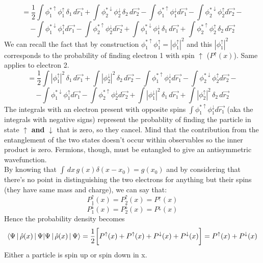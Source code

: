 \[
=\frac{1}{2}\int \phi_1^{*\uparrow}\phi_1^\uparrow \,\delta_1\, d\vec{r_1}
+\int \phi_2^{*\downarrow}\phi_2^\downarrow\, \delta_2\, d\vec{r_2}
-\int \phi_1^{*\uparrow}\phi_1^\downarrow d\vec{r_1}
-\int \phi_2^{*\downarrow}\phi_2^\uparrow d\vec{r_2}-\]
\[
-\int \phi_1^{*\downarrow}\phi_1^\uparrow d\vec{r_1}
-\int \phi_2^{*\uparrow}\phi_2^\downarrow d\vec{r_2}
+\int \phi_1^{*\downarrow}\phi_1^\downarrow\, \delta_1\, d\vec{r_1}
+\int \phi_2^{*\uparrow}\phi_2^\uparrow\, \delta_2\, d\vec{r_2}
\]
We can recall the fact that by construction $\phi_1^{*\uparrow}\phi_1^\uparrow=|\phi_1^\uparrow|^2$  and this $|\phi_1^\uparrow|^2$ corresponds to the probability of finding electron 1 with spin $\uparrow$ ($P^\uparrow(x)$). Same applies to electron 2.\\
\[
=\frac{1}{2}\int |\phi_1^\uparrow|^2 \,\delta_1\, d\vec{r_1}
+\int |\phi_2^\downarrow|^2\, \delta_2\, d\vec{r_2}
-\int \phi_1^{*\uparrow}\phi_1^\downarrow d\vec{r_1}
-\int \phi_2^{*\downarrow}\phi_2^\uparrow d\vec{r_2}-\]
\[
-\int \phi_1^{*\downarrow}\phi_1^\uparrow d\vec{r_1}
-\int \phi_2^{*\uparrow}\phi_2^\downarrow d\vec{r_2}
+\int |\phi_1^\downarrow|^2\, \delta_1\, d\vec{r_1}
+\int |\phi_2^\uparrow|^2\, \delta_2\, d\vec{r_2}
\]
The integrals with an electron present with opposite spins $\int \phi_1^{*\uparrow}\phi_1^\downarrow d\vec{r_1}$ (aka the integrals with negative signs) represent the probablity of finding the particle in state $\uparrow$ \textbf{and} $\downarrow$ that is zero, so they cancel. Mind that the contribution from the entanglement of the two states doesn't occur within observables so the inner product is zero. Fermions, though, must be entangled to give an antisymmetric wavefunction.\\
By knowing that $\int\,dx\, g(x)\delta(x-x_0)=g(x_0)$ and by considering that there's no point in distinguishing the two electrons for anything but their spins (they have same mass and charge), we can say that:
\[P_1^\uparrow(x)=P_2^\uparrow(x)=P^\uparrow(x)\]
\[P_1^\downarrow(x)=P_2^\downarrow(x)=P^\downarrow(x)\]
Hence the probability density becomes
\[
\braket{\Psi\,|\,\hat{\rho}(x)\,|\,\Psi}=\frac{1}{2}\bigg[P^\uparrow(x)+P^\uparrow(x)+P^\downarrow(x)+P^\downarrow(x)\bigg]=P^\uparrow(x)+P^\downarrow(x)
\]
Either a particle is spin up or spin down in x.
